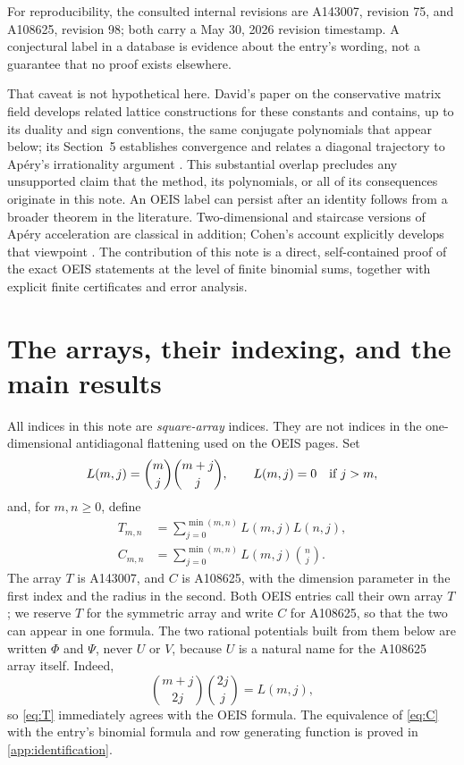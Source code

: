 \documentclass[11pt,letterpaper]{article}
\numberwithin{equation}{section}
\theoremstyle{definition}
\begin{document}
For reproducibility, the consulted internal revisions are A143007,
revision 75, and A108625, revision 98; both carry a May 30, 2026 revision
timestamp. A conjectural label in a database is evidence about the
entry's wording, not a guarantee that no proof exists elsewhere.

That caveat is not hypothetical here. David's paper on the conservative
matrix field develops related lattice constructions for these constants
and contains, up to its duality and sign conventions, the same conjugate
polynomials that appear below; its Section~5 establishes convergence and
relates a diagonal trajectory to Ap\'ery's irrationality argument
\cite[Examples 16, 19, 25; \S5]{david}. This substantial overlap precludes
any unsupported claim that the method, its polynomials, or all of its
consequences originate in this note. An OEIS label can persist after an
identity follows from a broader theorem in the literature. Two-dimensional
and staircase versions of Ap\'ery acceleration are classical in addition;
Cohen's account explicitly develops that viewpoint \cite[\S\S3--4]{cohen}.
The contribution of this note is a direct, self-contained proof of the
exact OEIS statements at the level of finite binomial sums, together with
explicit finite certificates and error analysis.

\section{The arrays, their indexing, and the main results}\label{sec:results}

All indices in this note are \emph{square-array} indices. They are not
indices in the one-dimensional antidiagonal flattening used on the
OEIS pages. Set
\begin{equation}\label{eq:L}
 L(m,j)=\binom mj\binom{m+j}{j},\qquad
 L(m,j)=0\quad\hbox{if }j>m,
\end{equation}
and, for $m,n\geq0$, define
\begin{align}
 T_{m,n}&=\sum_{j=0}^{\min(m,n)}L(m,j)L(n,j),\label{eq:T}\\
 C_{m,n}&=\sum_{j=0}^{\min(m,n)}L(m,j)\binom nj.\label{eq:C}
\end{align}
The array $T$ is A143007, and $C$ is A108625, with the dimension parameter
in the first index and the radius in the second. Both OEIS entries call
their own array $T$; we reserve $T$ for the symmetric array and write $C$
for A108625, so that the two can appear in one formula. The two rational
potentials built from them below are written $\Phi$ and $\Psi$, never $U$
or $V$, because $U$ is a natural name for the A108625 array itself.
Indeed,
\[
 \binom{m+j}{2j}\binom{2j}{j}=L(m,j),
\]
so \eqref{eq:T} immediately agrees with the OEIS formula. The equivalence
of \eqref{eq:C} with the entry's binomial formula and row generating
function is proved in \cref{app:identification}.
\end{document}
